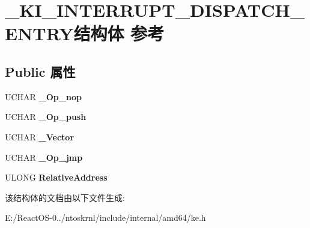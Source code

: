 \hypertarget{struct___k_i___i_n_t_e_r_r_u_p_t___d_i_s_p_a_t_c_h___e_n_t_r_y}{}\section{\+\_\+\+K\+I\+\_\+\+I\+N\+T\+E\+R\+R\+U\+P\+T\+\_\+\+D\+I\+S\+P\+A\+T\+C\+H\+\_\+\+E\+N\+T\+R\+Y结构体 参考}
\label{struct___k_i___i_n_t_e_r_r_u_p_t___d_i_s_p_a_t_c_h___e_n_t_r_y}
\subsection*{Public 属性}
\begin{DoxyCompactItemize}
\item 
\mbox{\label{struct___k_i___i_n_t_e_r_r_u_p_t___d_i_s_p_a_t_c_h___e_n_t_r_y_a670396e46f6d2d719e08928ba9dcaf6b}} 
U\+C\+H\+AR {\bfseries \+\_\+\+Op\+\_\+nop}
\item 
\mbox{\label{struct___k_i___i_n_t_e_r_r_u_p_t___d_i_s_p_a_t_c_h___e_n_t_r_y_a89a365ef3a13749e52d1831463a93cf5}} 
U\+C\+H\+AR {\bfseries \+\_\+\+Op\+\_\+push}
\item 
\mbox{\label{struct___k_i___i_n_t_e_r_r_u_p_t___d_i_s_p_a_t_c_h___e_n_t_r_y_a7885a822a1f718b5bb4ea2293f110375}} 
U\+C\+H\+AR {\bfseries \+\_\+\+Vector}
\item 
\mbox{\label{struct___k_i___i_n_t_e_r_r_u_p_t___d_i_s_p_a_t_c_h___e_n_t_r_y_afeaf7e83a1a86581af23773591598fe6}} 
U\+C\+H\+AR {\bfseries \+\_\+\+Op\+\_\+jmp}
\item 
\mbox{\label{struct___k_i___i_n_t_e_r_r_u_p_t___d_i_s_p_a_t_c_h___e_n_t_r_y_a7b26c73109b17de333fb96836dbd13e3}} 
U\+L\+O\+NG {\bfseries Relative\+Address}
\end{DoxyCompactItemize}


该结构体的文档由以下文件生成\+:\begin{DoxyCompactItemize}
\item 
E\+:/\+React\+O\+S-\/0../ntoskrnl/include/internal/amd64/ke.\+h\end{DoxyCompactItemize}
